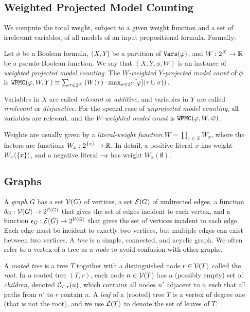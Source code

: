 \subsection{Weighted Projected Model Counting}

We compute the total weight, subject to a given weight function and a set of irrelevant variables, of all models of an input propositional formula.
Formally:
\begin{definition}
     Let $\phi$ be a Boolean formula, $\{X, Y\}$ be a partition of $\texttt{\upshape Vars}(\varphi)$, and $W: 2^X \to \mathbb{R}$ be a pseudo-Boolean function. We say that $(X, Y, \phi, W)$ is an instance of \emph{weighted projected model counting}.
    The \emph{$W$-weighted $Y$-projected model count} of $\phi$ is
    $\texttt{\upshape WPMC}(\varphi, W, Y) \equiv \sum_{\tau \in 2^X} \left(  W(\tau) \cdot \max_{\sigma \in 2^Y} [\varphi](\tau \cup \sigma)  \right)$.
\end{definition}

Variables in $X$ are called \emph{relevant} or \emph{additive}, and variables in $Y$ are called \emph{irrelevant} or \emph{disjunctive}. 
For the special case of \emph{unprojected model counting}, all variables are relevant, and the \emph{$W$-weighted model count} is $\texttt{\upshape WPMC}(\varphi, W, \varnothing)$.

Weights are usually given by a \emph{literal-weight function} $W = \prod_{x \in X} W_x$, where the factors are functions $W_x : 2^{\left\{ x \right\}} \to \mathbb{R}$.
In detail, a positive literal $x$ has weight $W_x(\left\{ x \right\})$, and a negative literal $\neg x$ has weight $W_x(\emptyset)$.

\subsection{Graphs}

A \emph{graph} $G$ has a set $\mathcal{V}(G)$ of vertices, a set $\mathcal{E}(G)$ of undirected edges, a function $\delta_G: \mathcal{V}(G) \to 2^{\mathcal{E}(G)}$ that gives the set of edges incident to each vertex, and a function $\epsilon_G: \mathcal{E}(G) \to 2^{\mathcal{V}(G)}$ that gives the set of vertices incident to each edge.
Each edge must be incident to exactly two vertices, but multiple edges can exist between two vertices.
A \emph{tree} is a simple, connected, and acyclic graph. 
We often refer to a vertex of a tree as a \emph{node} to avoid confusion with other graphs. %

A \emph{rooted tree} is a tree $T$ together with a distinguished node $r \in \mathcal{V}(T)$ called the \emph{root}.
In a rooted tree $(T, r)$, each node $n \in \mathcal{V}(T)$ has a (possibly empty) set of \emph{children}, denoted $\mathcal{C}_{T,r}(n)$, which contains all nodes $n'$ adjacent to $n$ such that all paths from $n'$ to $r$ contain $n$.
A \emph{leaf} of a (rooted) tree $T$ is a vertex of degree one (that is not the root), and we use $\mathcal{L}(T)$ to denote the set of leaves of $T$.